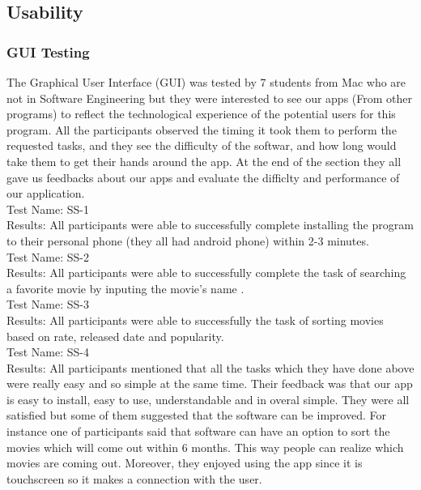 \documentclass[12pt, titlepage]{article}
\begin{document}
\subsection{Usability}
\subsubsection{GUI Testing}
The Graphical User Interface (GUI) was tested by 7 students from Mac who are not in Software Engineering but they were interested to see our apps (From other programs) to reflect the technological experience of the potential users for this program. All the participants observed the timing it took them to perform the requested tasks, and they see the difficulty of the softwar, and how long would take them to get their hands around the app. At the end of the section they all gave us feedbacks about our apps and evaluate the difficlty and performance of our application.\\

	
Test Name: SS-1 \\
Results: All participants were able to successfully complete installing the program to their personal phone (they all had android phone) within 2-3 minutes.\\

Test Name: SS-2 \\
Results: All participants were able to successfully complete the task of searching a favorite movie by inputing the movie's name .\\

Test Name: SS-3 \\
Results: All participants were able to successfully the task of sorting movies based on rate, released date and popularity.\\


Test Name: SS-4 \\
Results: All participants mentioned that all the tasks which they have done above were really easy and so simple at the same time. Their feedback was that our app is easy to install, easy to use, understandable and in overal simple. They were all satisfied but some of them suggested that the software can be improved. For instance one of participants said that software can have an option to sort the movies which  will come out within 6 months. This way people can realize which movies are coming out. Moreover, they enjoyed using the app since it is touchscreen so it makes a connection with the user. \\
\end{document}
